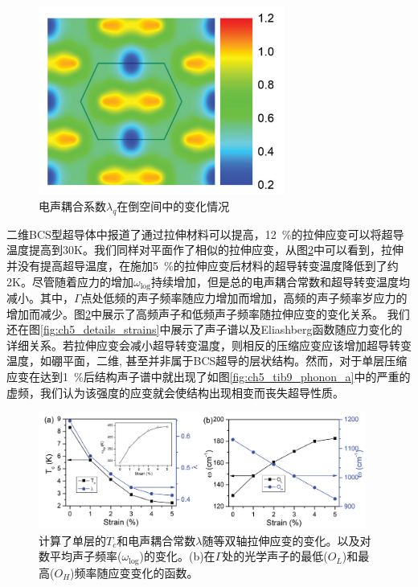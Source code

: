 \begin{figure}
  \includegraphics[width=0.72\textwidth]{figs/ch5_tib7_coupling.png}
  \centering
  \caption{电声耦合系数$\lambda_{q}$在倒空间中的变化情况}
  \label{fig:ch5_tib7_coupling}
\end{figure}

二维BCS型超导体中报道了通过拉伸材料可以提高，\SI{12}{\percent}的拉伸应变可以将超导温度提高到30K。我们同样对平面作了相似的拉伸应变，从图\ref{fig:ch5_tib7_strain}中可以看到，拉伸并没有提高超导温度，在施加\SI{5}{\percent}的拉伸应变后材料的超导转变温度降低到了约2K。尽管随着应力的增加$\omega_\mathrm{log}$持续增加，但是总的电声耦合常数和超导转变温度均减小。其中，$\Gamma$点处低频的声子频率随应力增加而增加，高频的声子频率岁应力的增加而减少。图\ref{fig:ch5_tib7_strain}中展示了高频声子和低频声子频率随拉伸应变的变化关系。
我们还在图\ref{fig:ch5_details_strains}中展示了声子谱以及Eliashberg函数随应力变化的详细关系。若拉伸应变会减小超导转变温度，则相反的压缩应变应该增加超导转变温度，如硼平面\cite{cheng2017suppressed}，二维\cite{liao2020doping},
甚至并非属于BCS超导的层状结构\cite{nie2009suppression}。然而，对于单层压缩应变在达到\SI{1}{\percent}后结构声子谱中就出现了如图\ref{fig:ch5_tib9_phonon_a}中的严重的虚频，我们认为该强度的应变就会使结构出现相变而丧失超导性质。

\begin{figure}
  \includegraphics[width=0.96\textwidth]{figs/ch5_tib7_strain.png}
  \centering
  \caption{计算了单层的$T_c$和电声耦合常数$\lambda$随等双轴拉伸应变的变化。以及对数平均声子频率($\omega_{\mathrm{log}}$)的变化。(b)在$\Gamma$处的光学声子的最低($O_L$)和最高($O_H$)频率随应变变化的函数。}
  \label{fig:ch5_tib7_strain}
\end{figure}

